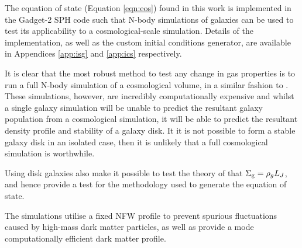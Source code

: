 The equation of state (Equation \ref{eqn:eos}) found in this work is implemented in the Gadget-2 SPH code \citep{springel_cosmological_2005} such that N-body simulations of galaxies can be used to test its applicability to a cosmological-scale simulation.
Details of the implementation, as well as the custom initial conditions generator, are available in Appendices \ref{app:isg} and \ref{app:ics} respectively.

It is clear that the most robust method to test any change in gas properties is to run a full N-body simulation of a cosmological volume, in a similar fashion to \citet{vogelsberger_introducing_2014, schaye_eagle_2015}.
These simulations, however, are incredibly computationally expensive and whilst a single galaxy simulation will be unable to predict the resultant galaxy population from a cosmological simulation, it will be able to predict the resultant density profile and stability of a galaxy disk.
It it is not possible to form a stable galaxy disk in an isolated case, then it is unlikely that a full cosmological simulation is worthwhile.

Using disk galaxies also make it possible to test the theory of \citet{schaye_model-independent_2001} that $\Sigma_\mathrm{g} = \rho_g L_J$, and hence provide a test for the methodology used to generate the equation of state.

The simulations utilise a fixed NFW profile \citep{navarro_structure_1996, coe_dark_2010} to prevent spurious fluctuations caused by high-mass dark matter particles, as well as provide a mode computationally efficient dark matter profile.
